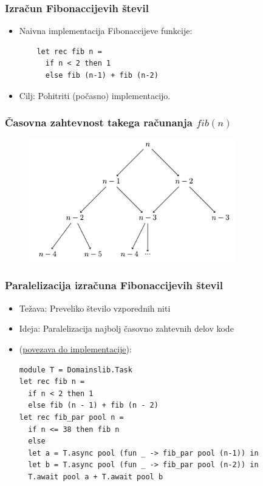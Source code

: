 \documentclass{beamer}
\begin{document}
\begin{frame}[fragile]
    \frametitle{Izračun Fibonaccijevih števil}
    \begin{itemize}
        \item Naivna implementacija Fibonaccijeve funkcije:
    \begin{verbatim}
    let rec fib n =
      if n < 2 then 1
      else fib (n-1) + fib (n-2)
    \end{verbatim}
        \item Cilj: Pohitriti (počasno) implementacijo.
    \end{itemize}
\end{frame}

\begin{frame}
  \frametitle{Časovna zahtevnost takega računanja $fib(n)$}
  \begin{figure}
      \centering
      \includegraphics[width=9cm]{slike/casovna_zahtevnost_racunanja_fib.png}
      \label{fig:casovna_zahtevnost_racunanja_fib}
    \end{figure}
\end{frame}

\begin{frame}[fragile]
    \frametitle{Paralelizacija izračuna Fibonaccijevih števil}
    \begin{itemize}
        \item Težava: Preveliko število vzporednih niti
        \item Ideja: Paralelizacija najbolj časovno zahtevnih delov kode
        \item (\href{https://github.com/tjazerzen/parallelisation-of-graph-algorithms-in-functional-programming-languages/blob/parallel_fibonacci/playground/graph/fib.ml}{povezava do implementacije}):
    \begin{verbatim}
module T = Domainslib.Task
let rec fib n = 
  if n < 2 then 1 
  else fib (n - 1) + fib (n - 2)
let rec fib_par pool n =
  if n <= 38 then fib n
  else
  let a = T.async pool (fun _ -> fib_par pool (n-1)) in
  let b = T.async pool (fun _ -> fib_par pool (n-2)) in
  T.await pool a + T.await pool b
    \end{verbatim}
    \end{itemize}
\end{frame}
\end{document}
